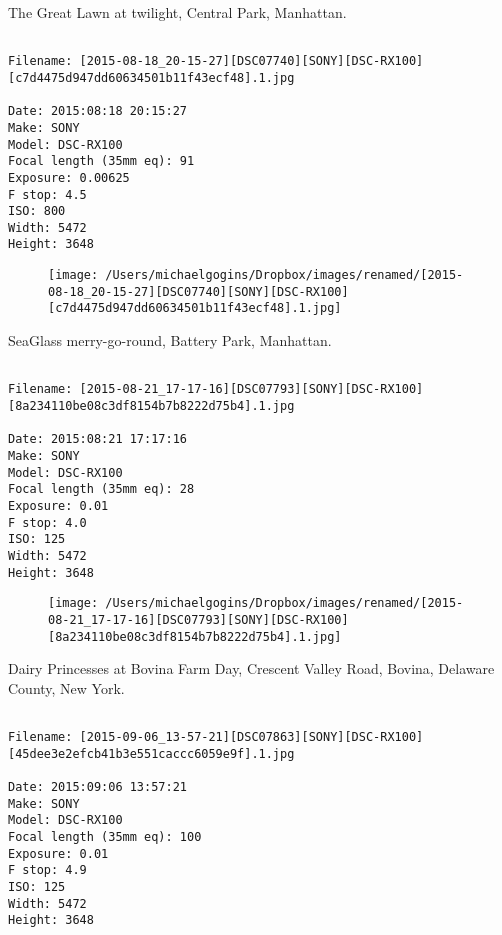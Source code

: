 \documentclass[11pt,letter,DIV=14,paper=landscape]{scrbook}
\begin{document}
\clearpage
\noindent The Great Lawn at twilight, Central Park, Manhattan.
\noindent
\begin{lstlisting}

Filename: [2015-08-18_20-15-27][DSC07740][SONY][DSC-RX100][c7d4475d947dd60634501b11f43ecf48].1.jpg

Date: 2015:08:18 20:15:27
Make: SONY
Model: DSC-RX100
Focal length (35mm eq): 91
Exposure: 0.00625
F stop: 4.5
ISO: 800
Width: 5472
Height: 3648
\end{lstlisting}
\clearpage

\begin{figure}
\texttt{[image: /Users/michaelgogins/Dropbox/images/renamed/[2015-08-18\_20-15-27][DSC07740][SONY][DSC-RX100][c7d4475d947dd60634501b11f43ecf48].1.jpg]}
\end{figure}
    
\clearpage
\noindent SeaGlass merry-go-round, Battery Park, Manhattan.
\noindent
\begin{lstlisting}

Filename: [2015-08-21_17-17-16][DSC07793][SONY][DSC-RX100][8a234110be08c3df8154b7b8222d75b4].1.jpg

Date: 2015:08:21 17:17:16
Make: SONY
Model: DSC-RX100
Focal length (35mm eq): 28
Exposure: 0.01
F stop: 4.0
ISO: 125
Width: 5472
Height: 3648
\end{lstlisting}
\clearpage

\begin{figure}
\texttt{[image: /Users/michaelgogins/Dropbox/images/renamed/[2015-08-21\_17-17-16][DSC07793][SONY][DSC-RX100][8a234110be08c3df8154b7b8222d75b4].1.jpg]}
\end{figure}
    
\clearpage
\noindent Dairy Princesses at Bovina Farm Day, Crescent Valley Road, Bovina, Delaware County, New York.
\noindent
\begin{lstlisting}

Filename: [2015-09-06_13-57-21][DSC07863][SONY][DSC-RX100][45dee3e2efcb41b3e551caccc6059e9f].1.jpg

Date: 2015:09:06 13:57:21
Make: SONY
Model: DSC-RX100
Focal length (35mm eq): 100
Exposure: 0.01
F stop: 4.9
ISO: 125
Width: 5472
Height: 3648
\end{lstlisting}
\clearpage
\end{document}
